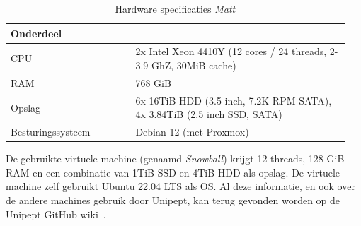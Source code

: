 \documentclass[11pt,dutch,faculty=we,layout=titlefont,underline=false,titleUppercase=true,titleUnderline=true]{ugent2016-report}
\begin{document}
    \begin{table}[h!]
        \centering
        \begin{tabular}{p{0.35\linewidth} p{0.6\linewidth}}
            Onderdeel         &                                                                         \\
            \hline\hline
            CPU               & 2x Intel Xeon 4410Y (12 cores / 24 threads, 2-3.9 GhZ, 30MiB cache)     \\
            RAM               & 768 GiB                                                                 \\
            Opslag            & 6x 16TiB HDD (3.5 inch, 7.2K RPM SATA), 4x 3.84TiB (2.5 inch SSD, SATA) \\
            Besturingssysteem & Debian 12 (met Proxmox)                                                 \\
            \hline
        \end{tabular}
        \caption{Hardware specificaties \textit{Matt}}
        \label{tab:Matt_hardware}
    \end{table}

    De gebruikte virtuele machine (genaamd \textit{Snowball}) krijgt 12 threads, 128 GiB RAM en een combinatie van 1TiB SSD en 4TiB HDD als opslag.
    De virtuele machine zelf gebruikt Ubuntu 22.04 LTS als OS\@.
    Al deze informatie, en ook over de andere machines gebruik door Unipept, kan terug gevonden worden op de Unipept GitHub wiki~\cite{unipept_infrastructure}.

    


    \printbibliography[heading=bibintoc,title={Referenties}] %


    \appendix
    
\end{document}

